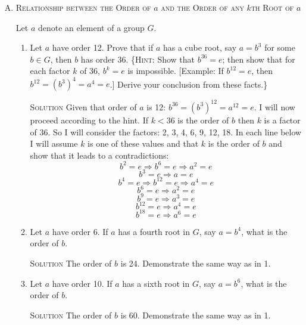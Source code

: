 \documentclass[twoside]{amsart}
\newcommand{\solution}{\textsc{Solution}\xspace}
\newcommand{\blank}{\vspace{5pt}}
\newcommand{\itm}{\blank\item}
\newcommand{\sol}{\blank\noindent\solution}
\begin{document}
\begin{enumerate}[A.]
\begin{enumerate}[1)]
      \sol If $(a^m)^t = e$ then $a^{mt} = e$ and by Theorem 5 $mt$ is a 
      multiple of $n$. So we know that for any value of $t$ for which
      $a^{mt} = e$, $n$ is a factor of $mt$. (this is all of the multiples that
      $m$ and $n$ have in common). Since $l$ is the least common multiple
      it must be less than or equal to $mt$.

      \itm Use parts 3 and 4 to prove that the order of $a^m$ is 
      $[\mathrm{lcm}(m,n)]/m$.

      \sol Let $k = \mathrm{lcm}(m,n)/m$. First by part 3 we know that
      $(a^m)^{k} = e$.  Second we know by part 4 that for any $t$ such that
      $(a^m)^t = e$ that $mt \ge mk$ and therefore $t >= k$. Therefore
      $k$ is the order of $a^m$.
   \end{enumerate}

   \itm \textsc{Relationship between the Order of $a$ and the Order of 
   any $k$th Root of $a$}

   \noindent Let $a$ denote an element of a group $G$.

   \begin{enumerate}[1)]
      \itm Let $a$ have order 12. Prove that if $a$ has a cube root, say $a =
      b^3$ for some $b \in G$, then $b$ has order 36. \{\textsc{Hint}: Show
      that $b^{36} = e$; then show that for each factor $k$ of 36,
      $b^k = e$ is impossible. [Example: If $b^{12} = e$, then $b^{12} = 
      (b^3)^4 = a^4 = e$.] Derive your conclusion from these facts.\}

      \sol Given that order of $a$ is 12: $b^{36} = (b^3)^12 = a^12 = e$.
      I will now proceed according to the hint. If $k < 36$ is the order of
      $b$ then $k$ is a factor of 36. So I will consider the factors:
      2, 3, 4, 6, 9, 12, 18.  In each line below I will assume $k$ 
      is one of these values and that $k$ is the order of $b$ and show
      that it leads to a contradictions:
      \[
         b^2 = e \Rightarrow b^6 = e \Rightarrow a^2 = e 
      \]
      \[
         b^3 = e \Rightarrow a = e
      \]
      \[
         b^4 = e \Rightarrow b^{12} = e \Rightarrow a^4 = e
      \]
      \[
         b^6 = e \Rightarrow a^2 = e
      \]
      \[
         b^9 = e \Rightarrow a^3 = e
      \]  
      \[
         b^{12} = e \Rightarrow a^4 = e
      \]  
      \[
         b^{18} = e \Rightarrow a^6 = e
      \]  

      \itm Let $a$ have order 6. If $a$ has a fourth root in $G$, say $a = 
      b^4$, what is the order of $b$.

      \sol The order of $b$ is 24. Demonstrate the same way as in 1.

      \itm Let $a$ have order 10. If $a$ has a sixth root in $G$, say $a = 
      b^6$, what is the order of $b$.

      \sol The order of $b$ is 60. Demonstrate the same way as in 1.
      
         

   \end{enumerate}


\end{enumerate}
\end{document}
